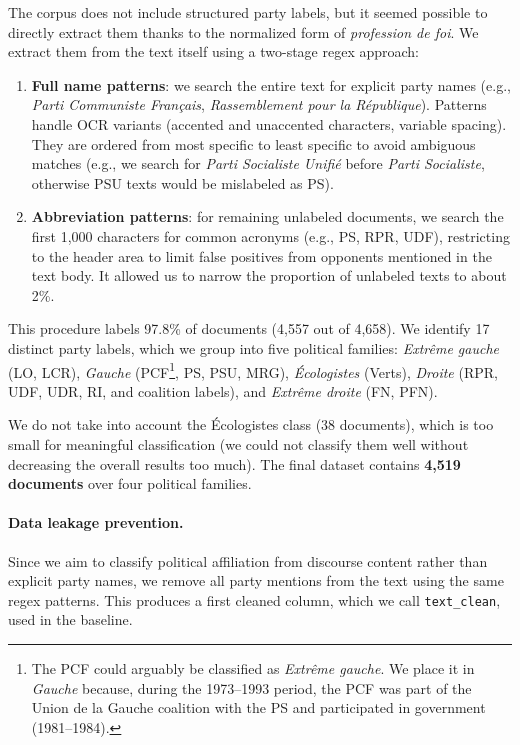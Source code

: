 \documentclass{article}
\begin{document}
The corpus does not include structured party labels, but it seemed possible to directly extract them thanks to the normalized form of \textit{profession de foi}. We extract them from the text itself using a two-stage regex approach:

\begin{enumerate}
    \item \textbf{Full name patterns}: we search the entire text for explicit party names (e.g., \textit{Parti Communiste Fran\c{c}ais}, \textit{Rassemblement pour la R\'{e}publique}). Patterns handle OCR variants (accented and unaccented characters, variable spacing). They are ordered from most specific to least specific to avoid ambiguous matches (e.g., we search for \textit{Parti Socialiste Unifi\'{e}} before \textit{Parti Socialiste}, otherwise PSU texts would be mislabeled as PS).
    \item \textbf{Abbreviation patterns}: for remaining unlabeled documents, we search the first 1{,}000 characters for common acronyms (e.g., PS, RPR, UDF), restricting to the header area to limit false positives from opponents mentioned in the text body. It allowed us to narrow the proportion of unlabeled texts to about 2\%.
\end{enumerate}

This procedure labels 97.8\% of documents (4{,}557 out of 4{,}658). We identify 17 distinct party labels, which we group into five political families: \textit{Extr\^{e}me gauche} (LO, LCR), \textit{Gauche} (PCF\footnote{The PCF could arguably be classified as \textit{Extr\^{e}me gauche}. We place it in \textit{Gauche} because, during the 1973--1993 period, the PCF was part of the Union de la Gauche coalition with the PS and participated in government (1981--1984).}, PS, PSU, MRG), \textit{\'{E}cologistes} (Verts), \textit{Droite} (RPR, UDF, UDR, RI, and coalition labels), and \textit{Extr\^{e}me droite} (FN, PFN).

We do not take into account the \'{E}cologistes class (38 documents), which is too small for meaningful classification (we could not classify them well without decreasing the overall results too much). The final dataset contains \textbf{4{,}519 documents} over four political families.

\paragraph{Data leakage prevention.}
Since we aim to classify political affiliation from discourse content rather than explicit party names, we remove all party mentions from the text using the same regex patterns. This produces a first cleaned column, which we call \texttt{text\_clean}, used in the baseline.
\end{document}
